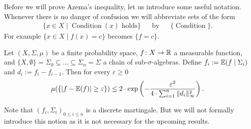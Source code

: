 Before we will prove Azema's inequality, let us introduce some useful notation. Whenever there is no danger of confusion we will abbreviate sets of the form
\begin{align*}
\{x\in X\mid \operatorname{Condition}(x)\text{ holds}\}&&\text{by}&&\{\operatorname{Condition}\}.
\end{align*}
For example $\{x\in X\mid f(x)= c\}$ becomes $\{f= c\}$.


\begin{lemma}\label{lem:azema}
Let $(X,\Sigma,\mu)$ be a finite probability space, $f\colon X\to\mathbb{R}$ a measurable function, and $\{X,\emptyset\}=\Sigma_0\subseteq\dots\subseteq\Sigma_n=\Sigma$ a chain of sub-$\sigma$-algebras. Define $f_i:=\mathbb{E}(f\mid\Sigma_i)$ and $d_i:=f_i-f_{i-1}$. Then for every $\varepsilon\geq0$
\[\mu(\{|f-\mathbb{E}(f)|\geq \varepsilon\})\leq 2\cdot\exp\left(-\frac{\varepsilon^2}{4\cdot\sum_{i=1}^{n}\|d_i\|^2_\infty}\right).\]
\end{lemma}
Note that $(f_i,\Sigma_i)_{0\leq i\leq n}$ is a discrete martingale. But we will not formally introduce this notion as it is not necessary for the upcoming results.

